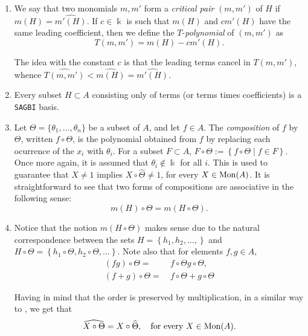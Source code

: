 \documentclass{amsart}
\theoremstyle{definition}
\theoremstyle{remark}
\numberwithin{equation}{section}
\begin{document}
\begin{enumerate}
\item [\rm (7)] We say that two monomials $m, m'$ form a {\em critical pair} $(m, m')$ of $H$ if $\widehat{m(H)} = \widehat{m'(H)}$. If $c\in \Bbbk$ is such that $m(H)$ and $cm'(H)$ have the same leading coefficient, then we define the $T$-{\em polynomial} of $(m, m')$ \cite[Definition 2]{Nordbeck2002} as 
$$
T(m, m') = m(H) - cm'(H).
$$

The idea with the constant $c$ is that the leading terms cancel in $T(m, m')$, whence $\widehat{T(m, m')} < \widehat{m(H)} = \widehat{m'(H)}$.

\item [\rm (8)] Every subset $H\subset A$ consisting only of terms (or terms times coefficients) is a \texttt{SAGBI} basis.

\item [\rm (9)] Let $\Theta = \{\theta_1, \dotsc, \theta_n\}$ be a subset of $A$, and let $f\in A$. The {\em composition} of $f$ by $\Theta$, written $f\circ \Theta$, is the polynomial obtained from $f$ by replacing each ocurrence of the $x_i$ with $\theta_i$. For a subset $F\subset A$, $F\circ \Theta := \left\{f\circ \Theta \mid f\in F\right\}$. Once more again, it is assumed that $\theta_i \notin \Bbbk$ for all $i$. This is used to guarantee that $X\neq 1$ implies $X\circ \widehat{\Theta} \neq 1$, for every $X\in {\rm Mon}(A)$. It is straightforward to see that two forms of compositions are associative in the following sense:
\begin{equation}\label{Nordbeck2002(3)analogue}
m(H) \circ \Theta = m(H\circ \Theta).
\end{equation}

\item [\rm (10)] Notice that the notion $m(H\circ \Theta)$ makes sense due to the natural correspondence between the sets $H = \left\{h_1, h_2, \dotsc, \right\}$ and $H\circ \Theta = \left\{h_1 \circ \Theta, h_2 \circ \Theta, \dotsc\right\}$. Note also that for elements $f, g \in A$, 
\begin{align}
    (fg) \circ \Theta = &\ f\circ \Theta g \circ \Theta, \label{Nordbeck2002(4)analogue} \\
    (f + g)\circ \Theta = &\ f\circ \Theta + g \circ \Theta \label{Nordbeck2002(5)analogue} 
\end{align}
    
Having in mind that the order is preserved by multiplication, in a similar way to \cite[Remark 1]{Nordbeck2002}, we get that 
\begin{equation}\label{Nordbeck2002(6)analogue}
    \widehat{X \circ \Theta} = X \circ \widehat{\Theta},\quad {\rm for\ every}\ X\in {\rm Mon}(A).
\end{equation}


\end{enumerate}
\end{document}
